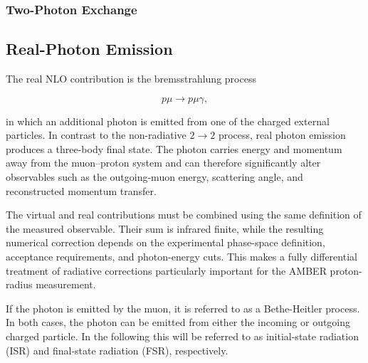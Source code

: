 \subsubsection{Two-Photon Exchange}
\subsection{Real-Photon Emission}
The real NLO contribution is the bremsstrahlung process

\begin{equation}
p\mu
\rightarrow
p\mu\gamma,
\label{eq:real_emission}
\end{equation}

in which an additional photon is emitted from one of the charged external particles. In contrast to the non-radiative \(2\rightarrow2\) process, real photon emission produces a three-body final state. The photon carries energy and momentum away from the muon--proton system and can therefore significantly alter observables such as the outgoing-muon energy, scattering angle, and reconstructed momentum transfer.

The virtual and real contributions must be combined using the same definition of the measured observable. Their sum is infrared finite, while the resulting numerical correction depends on the experimental phase-space definition, acceptance requirements, and photon-energy cuts. This makes a fully differential treatment of radiative corrections particularly important for the AMBER proton-radius measurement.

If the photon is emitted by the muon, it is referred to as a Bethe-Heitler process. In both cases, the photon can be emitted from either the incoming or outgoing charged particle. In the following this will be referred to as initial-state radiation (ISR) and final-state radiation (FSR), respectively. 


